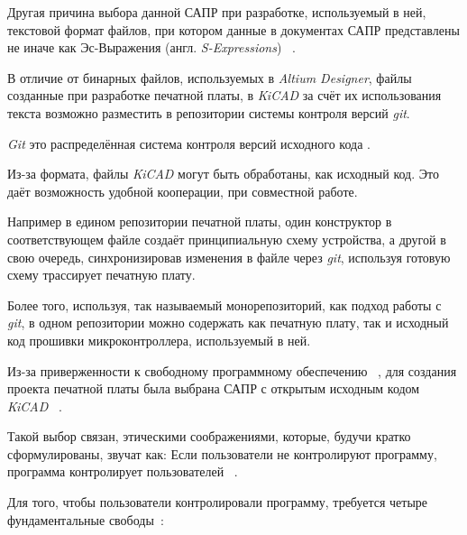 Другая причина выбора данной САПР при разработке,
используемый в ней, текстовой формат файлов,
при котором данные в документах САПР представлены
не иначе как Эс-Выражения (англ. \textit{S-Expressions})
~\cite{kicad-sexpr}.

В отличие от бинарных файлов,
используемых в \textit{Altium Designer},
файлы созданные при разработке печатной платы,
в \textit{KiCAD} за счёт их использования текста
возможно разместить в репозитории системы контроля версий
\textit{git}.

\textit{Git} это распределённая система контроля версий 
исходного кода \cite{git-dvcs}.

Из-за формата, файлы \textit{KiCAD} могут быть обработаны, как
исходный код.
Это даёт возможность удобной кооперации, при совместной работе.

Например в едином репозитории печатной платы, один конструктор в
соответствующем файле создаёт принципиальную схему устройства, а
другой в свою очередь, синхронизировав изменения в файле через
\textit{git}, используя готовую схему трассирует печатную плату.

Более того, используя, так называемый монорепозиторий, как подход
работы с \textit{git}, в одном репозитории можно содержать как
печатную плату, так и исходный код прошивки микроконтроллера,
используемый в ней.

Из-за приверженности к свободному программному обеспечению
~\cite{GNU-philosophy}, для создания проекта печатной платы была
выбрана САПР с открытым исходным кодом \textit{KiCAD}
~\cite{kicad-license}.

Такой выбор связан, этическими соображениями, которые, будучи
кратко сформулированы, звучат как:
Если пользователи не контролируют программу,
программа контролирует пользователей ~\cite{unfair-nonfree-programms}.

Для того, чтобы пользователи контролировали программу, требуется
четыре фундаментальные свободы~\cite{unfair-nonfree-programms}:

